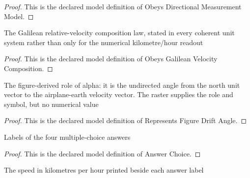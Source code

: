 \begin{proof}
  This is the declared model definition of Obeys Directional Measurement Model.
\end{proof}
\begin{definition}
  \label{def:physics:phyx-mini-0797:phyxminiproblems-problemphyxmini0797-obeysgalileanvelocitycomposition}
  The Galilean relative-velocity composition law, stated in every coherent unit system rather than only for the numerical kilometre/hour readout
\end{definition}
\begin{proof}
  This is the declared model definition of Obeys Galilean Velocity Composition.
\end{proof}
\begin{definition}
  \label{def:physics:phyx-mini-0797:phyxminiproblems-problemphyxmini0797-representsfiguredriftangle}
  The figure-derived role of alpha: it is the undirected angle from the north unit vector to the airplane-earth velocity vector. The raster supplies the role and symbol, but no numerical value
\end{definition}
\begin{proof}
  This is the declared model definition of Represents Figure Drift Angle.
\end{proof}
\begin{definition}
  \label{def:physics:phyx-mini-0797:phyxminiproblems-problemphyxmini0797-answerchoice}
  Labels of the four multiple-choice answers
\end{definition}
\begin{proof}
  This is the declared model definition of Answer Choice.
\end{proof}
\begin{definition}
  \label{def:physics:phyx-mini-0797:phyxminiproblems-problemphyxmini0797-displayedgroundspeedkilometersperhour}
  The speed in kilometres per hour printed beside each answer label
\end{definition}
